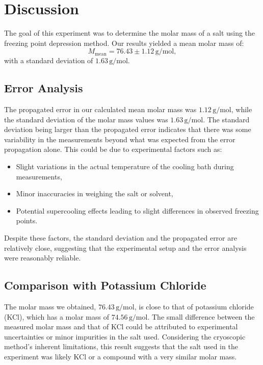 \documentclass[a4paper,12pt]{article}
\begin{document}
\section{Discussion}
The goal of this experiment was to determine the molar mass of a salt using the freezing point depression method. Our results yielded a mean molar mass of:
\begin{equation}
M_{\text{mean}} = 76.43 \pm 1.12 \, \text{g/mol},
\end{equation}
with a standard deviation of $1.63 \, \text{g/mol}$.

\subsection{Error Analysis}
The propagated error in our calculated mean molar mass was $1.12 \, \text{g/mol}$, while the standard deviation of the molar mass values was $1.63 \, \text{g/mol}$. The standard deviation being larger than the propagated error indicates that there was some variability in the measurements beyond what was expected from the error propagation alone. This could be due to experimental factors such as:
\begin{itemize}
    \item Slight variations in the actual temperature of the cooling bath during measurements,
    \item Minor inaccuracies in weighing the salt or solvent,
    \item Potential supercooling effects leading to slight differences in observed freezing points.
\end{itemize}
Despite these factors, the standard deviation and the propagated error are relatively close, suggesting that the experimental setup and the error analysis were reasonably reliable.

\subsection{Comparison with Potassium Chloride}
The molar mass we obtained, $76.43 \, \text{g/mol}$, is close to that of potassium chloride (KCl), which has a molar mass of $74.56 \, \text{g/mol}$. The small difference between the measured molar mass and that of KCl could be attributed to experimental uncertainties or minor impurities in the salt used. Considering the cryoscopic method's inherent limitations, this result suggests that the salt used in the experiment was likely KCl or a compound with a very similar molar mass.
\end{document}
